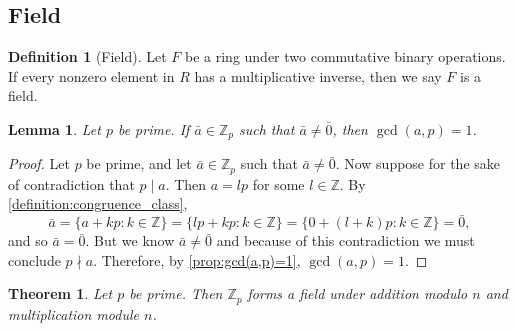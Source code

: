 \documentclass[12pt, titlepage]{amsart}
\newcommand\Z{{\mathbb Z}}
\newtheorem{theorem}{Theorem}[subsection]
\newtheorem{lemma}{Lemma}[subsection]
\theoremstyle{definition}
\newtheorem{definition}{Definition}[subsection]
\begin{document}

	
	\subsection{Field}
		
	\begin{definition}[Field]\label{definition:field}
		Let $F$ be a ring under two commutative binary operations.
		If every nonzero element in $R$ has a multiplicative inverse, then we say $F$ is a field.
	\end{definition}

	\begin{lemma}\label{lemma:all_a_relatively prime_p}
		Let $p$ be prime. If $\bar{a} \in \Z_p$ such that $\bar{a} \neq \bar{0}$, then $\gcd(a,p) = 1$.
	\end{lemma}
	
	\begin{proof}
		Let $p$ be prime, and let $\bar{a} \in \Z_p$ such that $\bar{a} \neq \bar{0}$.
		Now suppose for the sake of contradiction that $p \mid a$.
		Then $a = lp$ for some $l \in \Z$.
		By \cref{definition:congruence_class},
		$$\bar{a} = \{ a + kp : k\in\Z \} = \{ lp + kp : k\in\Z \} = \{ 0 + (l+k)p : k\in\Z \} = \bar{0},$$
		and so $\bar{a} = \bar{0}$.
		But we know $\bar{a} \neq \bar{0}$ and because of this contradiction we must conclude $p \nmid a$.
		Therefore, by \cref{prop:gcd(a,p)=1}, $\gcd(a,p) = 1$.
	\end{proof}
	
	\begin{theorem}\label{theorem:Zp_is_a_field}
		Let $p$ be prime. Then $\Z_p$ forms a field under addition modulo $n$ and multiplication module $n$.
	\end{theorem}
	
\end{document}

